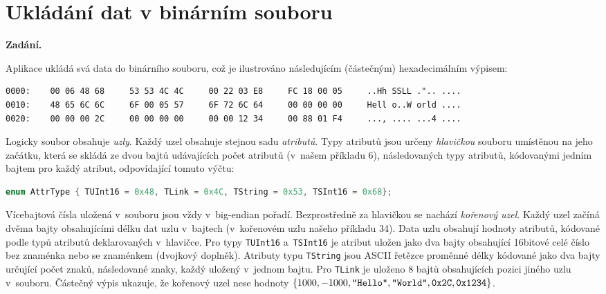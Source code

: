 \section{Ukládání dat v binárním souboru}

\noindent\textbf{Zadání.}\par
Aplikace ukládá svá data do binárního souboru, což je ilustrováno následujícím (částečným)
hexadecimálním výpisem:

\begin{lstlisting}
0000:    00 06 48 68     53 53 4C 4C     00 22 03 E8     FC 18 00 05     ..Hh SSLL .".. ....
0010:    48 65 6C 6C     6F 00 05 57     6F 72 6C 64     00 00 00 00     Hell o..W orld ....
0020:    00 00 00 2C     00 00 00 00     00 00 12 34     00 88 01 F4     ..., .... ...4 ....
\end{lstlisting}

Logicky soubor obsahuje \textit{uzly}. Každý uzel obsahuje stejnou sadu \textit{atributů}.
Typy atributů jsou určeny \textit{hlavičkou} souboru umístěnou na jeho začátku, která se
skládá ze dvou bajtů udávajících počet atributů (v~našem příkladu 6), následovaných typy
atributů, kódovanými jedním bajtem pro každý atribut, odpovídající tomuto výčtu:

\begin{lstlisting}[language=C++]
enum AttrType { TUInt16 = 0x48, TLink = 0x4C, TString = 0x53, TSInt16 = 0x68};
\end{lstlisting}

Vícebajtová čísla uložená v~souboru jsou vždy v~big-endian pořadí. Bezprostředně za
hlavičkou se nachází \textit{kořenový uzel}. Každý uzel začíná dvěma bajty obsahujícími
délku dat uzlu v~bajtech (v~kořenovém uzlu našeho příkladu 34). Data uzlu obsahují hodnoty
atributů, kódované podle typů atributů deklarovaných v~hlavičce. Pro typy \texttt{TUInt16}
a~\texttt{TSInt16} je atribut uložen jako dva bajty obsahující 16bitové celé číslo bez
znaménka nebo se znaménkem (dvojkový doplněk). Atributy typu \texttt{TString} jsou ASCII
řetězce proměnné délky kódované jako dva bajty určující počet znaků, následované znaky,
každý uložený v~jednom bajtu. Pro \texttt{TLink} je uloženo 8 bajtů obsahujících pozici
jiného uzlu v~souboru. Částečný výpis ukazuje, že kořenový uzel nese hodnoty
$\{1000, -1000, \texttt{\textquotedbl Hello\textquotedbl}, \texttt{\textquotedbl World\textquotedbl}, \texttt{0x2C}, \texttt{0x1234}\}$.

